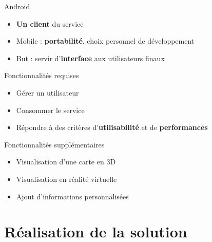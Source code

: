 \documentclass{beamer} %
\begin{document}
  \begin{frame}{\subsecname}
    \begin{block}{Android}
      \begin{itemize}
        \item \textbf{Un client} du service
        \item Mobile : \textbf{portabilité}, choix personnel de développement
        \item But : servir d'\textbf{interface} aux utilisateurs finaux
      \end{itemize}
    \end{block}

    \begin{alertblock}{Fonctionnalités requises}
      \begin{itemize}
        \item Gérer un utilisateur
        \item Consommer le service
        \item Répondre à des critères d'\textbf{utilisabilité} et de \textbf{performances}
      \end{itemize}
    \end{alertblock}

    \begin{exampleblock}{Fonctionnalités supplémentaires}
      \begin{itemize}
        \item Visualisation d'une carte en 3D
        \item Visualisation en réalité virtuelle
        \item Ajout d'informations personnalisées
      \end{itemize}
    \end{exampleblock}

  \end{frame}


  \section{Réalisation de la solution}
\end{document}
